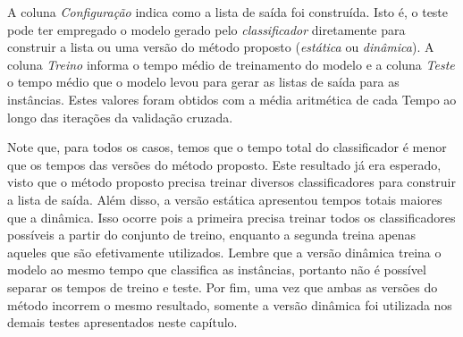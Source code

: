A coluna \textit{Configuração} indica como a lista de saída foi construída.
Isto é, o teste pode ter empregado o modelo gerado pelo \textit{classificador} diretamente para construir a lista ou uma versão do método proposto (\textit{estática} ou \textit{dinâmica}).
A coluna \textit{Treino} informa o tempo médio de treinamento do modelo e a coluna \textit{Teste} o tempo médio que o modelo levou para gerar as listas de saída para as instâncias.
Estes valores foram obtidos com a média aritmética de cada Tempo ao longo das iterações da validação cruzada.

Note que, para todos os casos, temos que o tempo total do classificador é menor que os tempos das versões do método proposto.
Este resultado já era esperado, visto que o método proposto precisa treinar diversos classificadores para construir a lista de saída.
Além disso, a versão estática apresentou tempos totais maiores que a dinâmica.
Isso ocorre pois a primeira precisa treinar todos os classificadores possíveis a partir do conjunto de treino, enquanto a segunda treina apenas aqueles que são efetivamente utilizados.
Lembre que a versão dinâmica treina o modelo ao mesmo tempo que classifica as instâncias, portanto não é possível separar os tempos de treino e teste.
Por fim, uma vez que ambas as versões do método incorrem o mesmo resultado, somente a versão dinâmica foi utilizada nos demais testes apresentados neste capítulo.

